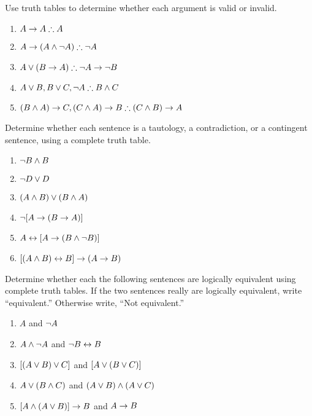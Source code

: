\solutions
\problempart
\label{pr.TT.valid}
Use truth tables to determine whether each argument is valid or invalid.
\begin{enumerate}
\item $A\eif A \therefore A$ %
\item $A\eif(A\eand\enot A) \therefore \enot A$ %
\item $A\eor(B\eif A) \therefore \enot A \eif \enot B$ %
\item $A\eor B, B\eor C, \enot A \therefore B \eand C$ %
\item $(B\eand A)\eif C, (C\eand A)\eif B \therefore (C\eand B)\eif A$ %
\end{enumerate}

\problempart Determine whether each sentence is a tautology, a contradiction, or a contingent sentence, using a complete truth table.
\begin{enumerate}
\item $\neg B \wedge B$ \vspace{.5ex}%
\item $\neg D \vee D$ \vspace{.5ex}%
\item $(A\wedge B) \vee (B\wedge A)$\vspace{.5ex} %
\item $\neg[A \rightarrow (B \rightarrow A)]$\vspace{.5ex} %
\item $A \leftrightarrow [A \rightarrow (B \wedge \neg B)]$ \vspace{.5ex}%
\item $[(A \wedge B) \leftrightarrow B] \rightarrow (A \rightarrow B)$ \vspace{.5ex}%
\end{enumerate}

\noindent\problempart
\label{pr.TT.equiv}
Determine whether each the following sentences are logically equivalent using complete truth tables. If the two sentences really are logically equivalent, write ``equivalent.'' Otherwise write, ``Not equivalent.'' 
\begin{enumerate}
\item $A$ and $\neg A$
\item $A \wedge \neg A$ and $\neg B \leftrightarrow B$
\item $[(A \vee B) \vee C]$ and $[A \vee (B \vee C)]$
\item $A \vee (B \wedge C)$ and $(A \vee B) \wedge (A \vee C)$
\item $[A \wedge (A \vee B)] \rightarrow B$ and $A \rightarrow B$
\end{enumerate}

